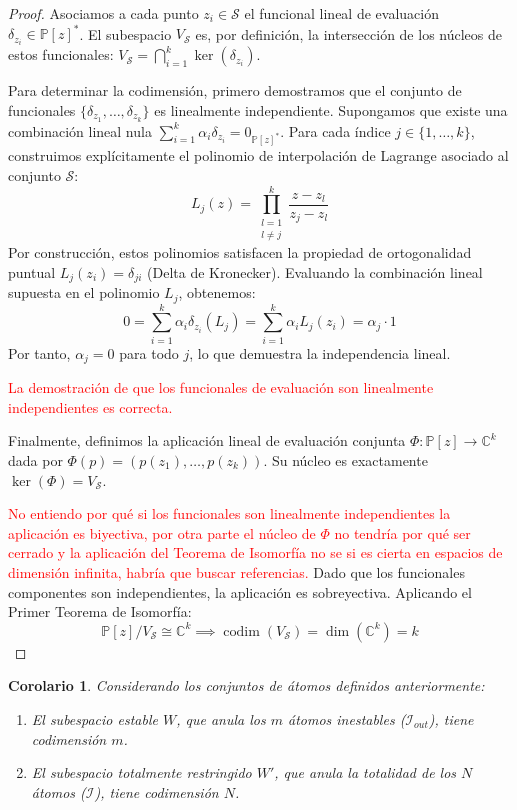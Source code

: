 \documentclass[12pt,a4paper]{article}
\newtheorem{corolario}{Corolario}
\newcommand{\C}{\mathbb{C}}
\newcommand{\Poly}{\mathbb{P}[z]}
\begin{document}
\begin{proof}
Asociamos a cada punto $z_i \in \mathcal{S}$ el funcional lineal de evaluación $\delta_{z_i} \in \Poly^*$. El subespacio $V_{\mathcal{S}}$ es, por definición, la intersección de los núcleos de estos funcionales: $V_{\mathcal{S}} = \bigcap_{i=1}^k \ker(\delta_{z_i})$.

Para determinar la codimensión, primero demostramos que el conjunto de funcionales $\{\delta_{z_1}, \dots, \delta_{z_k}\}$ es linealmente independiente. Supongamos que existe una combinación lineal nula $\sum_{i=1}^k \alpha_i \delta_{z_i} = 0_{\Poly^*}$.
Para cada índice $j \in \{1, \dots, k\}$, construimos explícitamente el polinomio de interpolación de Lagrange asociado al conjunto $\mathcal{S}$:
\begin{equation}
    L_j(z) = \prod_{\substack{l=1 \\ l \neq j}}^{k} \frac{z - z_l}{z_j - z_l}
\end{equation}
Por construcción, estos polinomios satisfacen la propiedad de ortogonalidad puntual $L_j(z_i) = \delta_{ji}$ (Delta de Kronecker). Evaluando la combinación lineal supuesta en el polinomio $L_j$, obtenemos:
$$ 0 = \sum_{i=1}^k \alpha_i \delta_{z_i}(L_j) = \sum_{i=1}^k \alpha_i L_j(z_i) = \alpha_j \cdot 1 $$
Por tanto, $\alpha_j = 0$ para todo $j$, lo que demuestra la independencia lineal.

\textcolor{red}{La demostración de que los funcionales de evaluación son linealmente independientes es correcta.}

Finalmente, definimos la aplicación lineal de evaluación conjunta $\Phi: \Poly \to \C^k$ dada por $\Phi(p) = (p(z_1), \dots, p(z_k))$. Su núcleo es exactamente $\ker(\Phi) = V_{\mathcal{S}}$. 

\textcolor{red}{No entiendo por qué si los funcionales son linealmente independientes la aplicación es biyectiva, por otra parte el núcleo de $\Phi$ no tendría por qué ser cerrado y la aplicación del Teorema de Isomorfía no se si es cierta en espacios de dimensión infinita, habría que buscar referencias. }
Dado que los funcionales componentes son independientes, la aplicación es sobreyectiva. Aplicando el Primer Teorema de Isomorfía:
$$ \Poly / V_{\mathcal{S}} \cong \C^k \implies \operatorname{codim}(V_{\mathcal{S}}) = \dim(\C^k) = k $$
\end{proof}

\begin{corolario}
Considerando los conjuntos de átomos definidos anteriormente:
\begin{enumerate}
    \item El subespacio estable $W$, que anula los $m$ átomos inestables ($\mathcal{I}_{out}$), tiene codimensión $m$.
    \item El subespacio totalmente restringido $W'$, que anula la totalidad de los $N$ átomos ($\mathcal{I}$), tiene codimensión $N$.
\end{enumerate}
\end{corolario}
\end{document}

